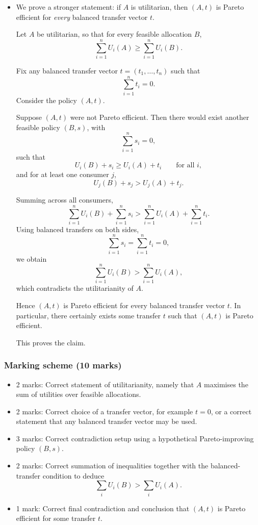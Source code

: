 \documentclass[12pt]{article}
\begin{document}
\begin{itemize}
    \item We prove a stronger statement: if \(A\) is utilitarian, then \((A,t)\) is Pareto efficient for \emph{every} balanced transfer vector \(t\).

    Let \(A\) be utilitarian, so that for every feasible allocation \(B\),
    \[
    \sum_{i=1}^n U_i(A)\ge \sum_{i=1}^n U_i(B).
    \]

    Fix any balanced transfer vector \(t=(t_1,\dots,t_n)\) such that
    \[
    \sum_{i=1}^n t_i=0.
    \]
    Consider the policy \((A,t)\).

    Suppose \((A,t)\) were not Pareto efficient. Then there would exist another feasible policy \((B,s)\), with
    \[
    \sum_{i=1}^n s_i=0,
    \]
    such that
    \[
    U_i(B)+s_i\ge U_i(A)+t_i
    \qquad\text{for all }i,
    \]
    and for at least one consumer \(j\),
    \[
    U_j(B)+s_j>U_j(A)+t_j.
    \]

    Summing across all consumers,
    \[
    \sum_{i=1}^n U_i(B)+\sum_{i=1}^n s_i
    >
    \sum_{i=1}^n U_i(A)+\sum_{i=1}^n t_i.
    \]
    Using balanced transfers on both sides,
    \[
    \sum_{i=1}^n s_i=\sum_{i=1}^n t_i=0,
    \]
    we obtain
    \[
    \sum_{i=1}^n U_i(B)>\sum_{i=1}^n U_i(A),
    \]
    which contradicts the utilitarianity of \(A\).

    Hence \((A,t)\) is Pareto efficient for every balanced transfer vector \(t\). In particular, there certainly exists some transfer \(t\) such that \((A,t)\) is Pareto efficient.

    This proves the claim.
\end{itemize}

\newpage
\subsubsection{Marking scheme (10 marks)}

\begin{itemize}
    \item 2 marks: Correct statement of utilitarianity, namely that \(A\) maximises the sum of utilities over feasible allocations.
    \item 2 marks: Correct choice of a transfer vector, for example \(t=0\), or a correct statement that any balanced transfer vector may be used.
    \item 3 marks: Correct contradiction setup using a hypothetical Pareto-improving policy \((B,s)\).
    \item 2 marks: Correct summation of inequalities together with the balanced-transfer condition to deduce
    \[
    \sum_i U_i(B)>\sum_i U_i(A).
    \]
    \item 1 mark: Correct final contradiction and conclusion that \((A,t)\) is Pareto efficient for some transfer \(t\).
\end{itemize}
\end{document}
